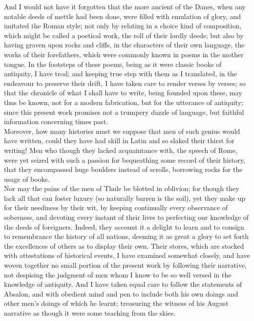 \documentclass[10pt,a4paper]{report}
\begin{document}
And I would not have it forgotten that the more ancient of the Danes, when any notable deeds of mettle had been done, were filled with emulation of glory, and imitated the Roman style; not only by relating in a choice kind of composition, which might be called a poetical work, the roll of their lordly deeds; but also by having graven upon rocks and cliffs, in the characters of their own language, the works of their forefathers, which were commonly known in poems in the mother tongue. In the footsteps of these poems, being as it were classic books of antiquity, I have trod; and keeping true step with them as I translated, in the endeavour to preserve their drift, I have taken care to render verses by verses; so that the chronicle of what I shall have to write, being founded upon these, may thus be known, not for a modern fabrication, but for the utterance of antiquity; since this present work promises not a trumpery dazzle of language, but faithful information concerning times past.\\

Moreover, how many histories must we suppose that men of such genius would have written, could they have had skill in Latin and so slaked their thirst for writing! Men who though they lacked acquaintance with, the speech of Rome, were yet seized with such a passion for bequeathing some record of their history, that they encompassed huge boulders instead of scrolls, borrowing rocks for the usage of books.\\

Nor may the pains of the men of Thule be blotted in oblivion; for though they lack all that can foster luxury (so naturally barren is the soil), yet they make up for their neediness by their wit, by keeping continually every observance of soberness, and devoting every instant of their lives to perfecting our knowledge of the deeds of foreigners. Indeed, they account it a delight to learn and to consign to remembrance the history of all nations, deeming it as great a glory to set forth the excellences of others as to display their own. Their stores, which are stocked with attestations of historical events, I have examined somewhat closely, and have woven together no small portion of the present work by following their narrative, not despising the judgment of men whom I know to be so well versed in the knowledge of antiquity. And I have taken equal care to follow the statements of Absalon, and with obedient mind and pen to include both his own doings and other men's doings of which he learnt; treasuring the witness of his August narrative as though it were some teaching from the skies.\\
\end{document}
